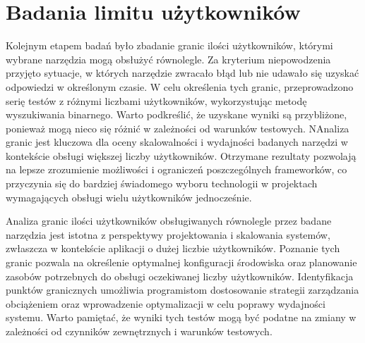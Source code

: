 \section{Badania limitu użytkowników}

Kolejnym etapem badań było zbadanie granic ilości użytkowników, którymi wybrane narzędzia mogą obsłużyć równolegle.
Za kryterium niepowodzenia przyjęto sytuacje, w których narzędzie zwracało błąd lub nie udawało się uzyskać odpowiedzi w określonym czasie.
W celu określenia tych granic, przeprowadzono serię testów z różnymi liczbami użytkowników, wykorzystując metodę wyszukiwania binarnego.
Warto podkreślić, że uzyskane wyniki są przybliżone, ponieważ mogą nieco się różnić w zależności od warunków testowych.
NAnaliza granic jest kluczowa dla oceny skalowalności i wydajności badanych narzędzi w kontekście obsługi większej liczby użytkowników.
Otrzymane rezultaty pozwolają na lepsze zrozumienie możliwości i ograniczeń poszczególnych frameworków, co przyczynia się do bardziej świadomego wyboru technologii w projektach wymagających obsługi wielu użytkowników jednocześnie.

Analiza granic ilości użytkowników obsługiwanych równolegle przez badane narzędzia jest istotna z perspektywy projektowania i skalowania systemów, zwłaszcza w kontekście aplikacji o dużej liczbie użytkowników.
Poznanie tych granic pozwala na określenie optymalnej konfiguracji środowiska oraz planowanie zasobów potrzebnych do obsługi oczekiwanej liczby użytkowników.
Identyfikacja punktów granicznych umożliwia programistom dostosowanie strategii zarządzania obciążeniem oraz wprowadzenie optymalizacji w celu poprawy wydajności systemu.
Warto pamiętać, że wyniki tych testów mogą być podatne na zmiany w zależności od czynników zewnętrznych i warunków testowych.